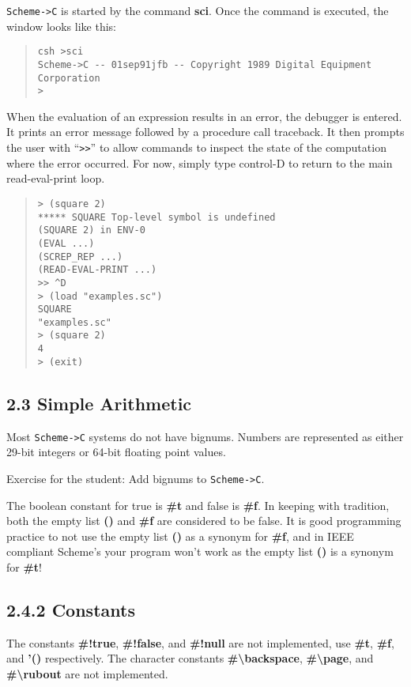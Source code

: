 \documentclass[10pt]{article}
\begin{document}
\texttt{Scheme->C} is started by the command \textbf{sci}.  Once the command
is executed, the window looks like this:

\begin{quote}
\begin{verbatim}
csh >sci
Scheme->C -- 01sep91jfb -- Copyright 1989 Digital Equipment Corporation
>
\end{verbatim}
\end{quote}

When the evaluation of an expression results in an error, the
debugger is entered.  It prints an error message followed by a
procedure call traceback.  It then prompts the user with ``\texttt{>>}''
to allow commands to inspect the state of the computation
where the error occurred.  For now, simply type control-D to
return to the main read-eval-print loop.
\begin{quote}
\begin{verbatim}
> (square 2)
***** SQUARE Top-level symbol is undefined
(SQUARE 2) in ENV-0
(EVAL ...)
(SCREP_REP ...)
(READ-EVAL-PRINT ...)
>> ^D
> (load "examples.sc")
SQUARE
"examples.sc"
> (square 2)
4
> (exit)
\end{verbatim}
\end{quote}

\subsection*{2.3 Simple Arithmetic}

Most \texttt{Scheme->C} systems do not have bignums.  Numbers are
represented as either 29-bit integers or 64-bit floating point
values.

Exercise for the student:  Add bignums to \texttt{Scheme->C}.

The boolean constant for true is \textbf{\#t} and false is \textbf{\#f}.
In keeping with tradition, both the empty list \textbf{()} and \textbf{\#f}
are considered to be false.  It is good programming practice
to not use the empty list \textbf{()} as a synonym for \textbf{\#f}, and in
IEEE compliant Scheme's your program won't work as the empty
list \textbf{()} is a synonym for \textbf{\#t}!

\subsection*{2.4.2 Constants}

The constants \textbf{\#!true}, \textbf{\#!false}, and \textbf{\#!null} are not implemented,
use \textbf{\#t}, \textbf{\#f}, and \textbf{'()} respectively. The character
constants \textbf{\#\textbackslash{}backspace}, \textbf{\#\textbackslash{}page}, and \textbf{\#\textbackslash{}rubout} are not
implemented.
\end{document}
